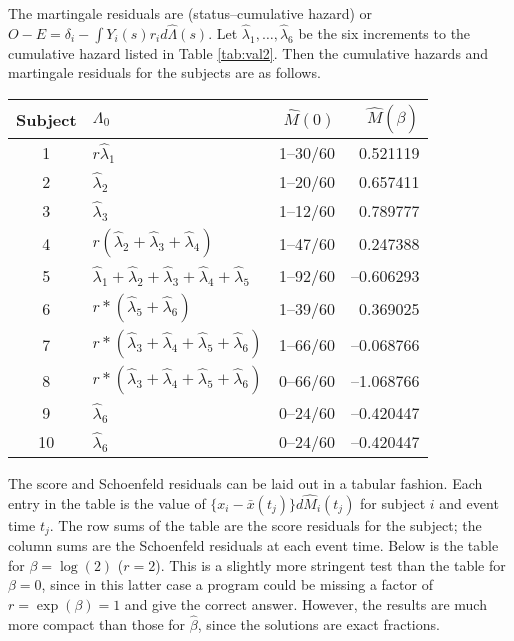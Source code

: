 \documentclass[11pt]{article}
\def\bhat{\hat \beta}        %
\def\Mhat{\widehat M}        %
\def\xbar{\bar x}
\def\lhat{\hat \Lambda}
\begin{document}
\def\haz{\hat \lambda}
The martingale residuals are (status--cumulative hazard) 
or $O-E = \delta_i - \int Y_i(s) r_i d\lhat(s)$.
Let $\haz_1, \ldots, \haz_6$ be the six increments to the cumulative
hazard listed in Table \ref{tab:val2}.  Then the cumulative hazards and
martingale residuals for the subjects are as follows.
\begin{center}
\begin{tabular}{c|lrr}
Subject &$\Lambda_0$ & $\Mhat(0)$ & $\Mhat(\bhat)$ \\ \hline
1& $r\haz_1$ 	& 1--30/60  &   0.521119 \\
2& $\haz_2 $	& 1--20/60   &  0.657411\\
3& $\haz_3 $ 	& 1--12/60   &  0.789777 \\
4& $r(\haz_2 + \haz_3 + \haz_4)$& 1--47/60 & 0.247388\\
5& $\haz_1+\haz_2+\haz_3+\haz_4+\haz_5$& 1--92/60 & --0.606293\\
6 &$r*(\haz_5 + \haz_6) $& 1--39/60 & 0.369025 \\
7& $r*(\haz_3+\haz_4+\haz_5+ \haz_6)$& 1--66/60&--0.068766 \\
8& $r*(\haz_3+\haz_4+\haz_5+ \haz_6)$& 0--66/60&--1.068766 \\
9& $\haz_6$ 	& 0--24/60 &  --0.420447 \\  
10& $\haz_6$ 	& 0--24/60 &  --0.420447   
\end{tabular}
\end{center}

The score and Schoenfeld residuals can be laid out in a tabular fashion.
Each entry in the table is the value of $\{x_i - \xbar(t_j)\} d\Mhat_i(t_j)$
for subject $i$ and event time $t_j$.  
The row sums of the table are the score residuals for the subject; 
the column sums are the Schoenfeld residuals at each event time.
Below is the table for $\beta= \log(2)$ ($r=2$).  
This is a slightly more stringent test than the table for $\beta=0$,
since in this latter case a program could be missing a factor of 
$r = \exp(\beta)=1$ and give the correct answer.
However, the results are much more compact than those for $\bhat$,
since the solutions are exact fractions.

\newcommand{\pf}[2]{$\phantom{-}\frac{#1}{#2}$}   %
\newcommand{\nf}[2]{$-\frac{#1}{#2}$}  %
\renewcommand{\arraystretch}{1.5}
\end{document}
